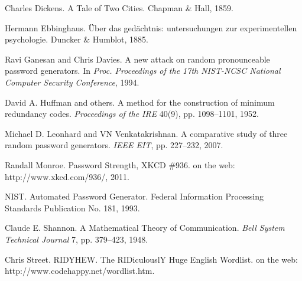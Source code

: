 \documentclass[preprint]{soups}
\newcommand{\postDoc}{}
\newenvironment{SingleColumn}{\begin{list}{}{\topsep=0pt\partopsep=0pt%
\listparindent=0pt\itemindent=0pt\labelwidth=0pt\leftmargin=0pt\rightmargin=0pt%
\itemsep=0pt\parsep=0pt}\item}{\end{list}}
\newenvironment{AutoBibliography}{\begin{small}}{\end{small}}
\newcommand{\Autobibentry}[1]{\hspace{0.05\linewidth}\parbox[t]{0.95\linewidth}{\parindent=-0.05\linewidth#1\vspace{1.0ex}}}
\begin{document}
\begin{AutoBibliography}
\begin{SingleColumn}
\label{t:x28autobib_x22Charles_DickensA_Tale_of_Two_CitiesChapman_x26_Hall1859x22x29}\Autobibentry{Charles Dickens. A Tale of Two Cities. Chapman \& Hall, 1859.}

\label{t:x28autobib_x22Hermann_Ebbinghausxdcber_das_gedxe4chtnisx3a_untersuchungen_zur_experimentellen_psychologieDuncker_x26_Humblot1885x22x29}\Autobibentry{Hermann Ebbinghaus. \"{U}ber das ged\"{a}chtnis: untersuchungen zur experimentellen psychologie. Duncker \& Humblot, 1885.}

\label{t:x28autobib_x22Ravi_Ganesan_and_Chris_DaviesA_new_attack_on_random_pronounceable_password_generatorsIn_Procx2e_Proceedings_of_the_17th_NISTx2dNCSC_National_Computer_Security_Conference1994x22x29}\Autobibentry{Ravi Ganesan and Chris Davies. A new attack on random pronounceable password generators. In \textit{Proc. Proceedings of the 17th NIST{-}NCSC National Computer Security Conference}, 1994.}

\label{t:x28autobib_x22David_Ax2e_Huffman_and_othersA_method_for_the_construction_of_minimum_redundancy_codesProceedings_of_the_IRE_40x289x29x2c_ppx2e_1098x2dx2d11011952x22x29}\Autobibentry{David A. Huffman and others. A method for the construction of minimum redundancy codes. \textit{Proceedings of the IRE} 40(9), pp. 1098{--}1101, 1952.}

\label{t:x28autobib_x22Michael_Dx2e_Leonhard_and_VN_VenkatakrishnanA_comparative_study_of_three_random_password_generatorsIEEE_EITx2c_ppx2e_227x2dx2d2322007x22x29}\Autobibentry{Michael D. Leonhard and VN Venkatakrishnan. A comparative study of three random password generators. \textit{IEEE EIT}, pp. 227{--}232, 2007.}

\label{t:x28autobib_x22Randall_MonroePassword_Strengthx2c_XKCD_x23936on_the_webx3a_httpx3ax2fx2fwwwx2exkcdx2ecomx2f936x2f2011x22x29}\Autobibentry{Randall Monroe. Password Strength, XKCD \#936. on the web: http://www.xkcd.com/936/, 2011.}

\label{t:x28autobib_x22NISTAutomated_Password_GeneratorFederal_Information_Processing_Standards_Publication_Nox2e_1811993x22x29}\Autobibentry{NIST. Automated Password Generator. Federal Information Processing Standards Publication No. 181, 1993.}

\label{t:x28autobib_x22Claude_Ex2e_ShannonA_Mathematical_Theory_of_CommunicationBell_System_Technical_Journal_7x2c_ppx2e_379x2dx2d4231948x22x29}\Autobibentry{Claude E. Shannon. A Mathematical Theory of Communication. \textit{Bell System Technical Journal} 7, pp. 379{--}423, 1948.}

\label{t:x28autobib_x22Chris_StreetRIDYHEWx2e_The_RIDiculouslY_Huge_English_Wordliston_the_webx3a_httpx3ax2fx2fwwwx2ecodehappyx2enetx2fwordlistx2ehtmx22x29}\Autobibentry{Chris Street. RIDYHEW. The RIDiculouslY Huge English Wordlist. on the web: http://www.codehappy.net/wordlist.htm.}\end{SingleColumn}\end{AutoBibliography}

\postDoc
\end{document}
